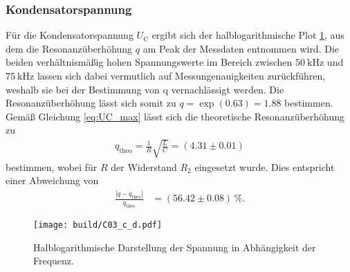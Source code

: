 \subsubsection{Kondensatorspannung}
Für die Kondensatorspannung $U_\text{C}$ ergibt sich der halblogarithmische Plot \ref{fig:plot_spannung}, aus dem die 
Resonanzüberhöhung $q$ am Peak der Messdaten entnommen wird.
Die beiden verhältnismäßig hohen Spannungswerte im Bereich zwischen $\qty{50}{\kilo\hertz}$ und $\qty{75}{\kilo\hertz}$
lassen sich dabei vermutlich auf Messungenauigkeiten zurückführen, weshalb sie bei der Bestimmung von q vernachlässigt werden.
Die Resonanzüberhöhung lässt sich somit zu $q = \exp(0.63) = 1.88$ bestimmen. 
Gemäß Gleichung \eqref{eq:UC_max} lässt sich die theoretische Resonanzüberhöhung zu 
\begin{align}
    q_\text{theo} = \frac{1}{R}\sqrt{\frac{L}{C}} = (\num{4.31} \pm \num{0.01})
\end{align}
bestimmen, wobei für $R$ der Widerstand $R_2$ eingesetzt wurde.
Dies entspricht einer Abweichung von
\begin{align*}
    \frac{|q - q_\text{theo}|}{q_\text{theo}} &= (\num[]{56.42} \pm \num[]{0.08}) \, \%.
\end{align*}


\begin{figure}[H]
    \centering
    \texttt{[image: build/C03\_c\_d.pdf]}
    \caption{Halblogarithmische Darstellung der Spannung in Abhängigkeit der Frequenz.}
    \label{fig:plot_spannung}
\end{figure}

